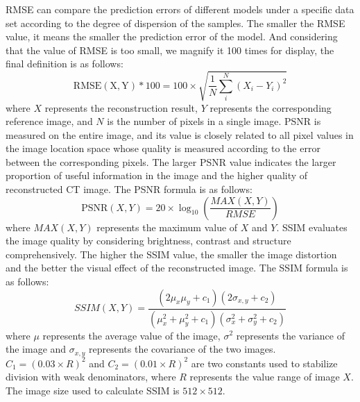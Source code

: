 \documentclass[lettersize,journal]{IEEEtran}
\begin{document}
RMSE can compare the prediction errors of different models under a specific data set according to the degree of dispersion of the samples. The smaller the RMSE value, it means the smaller the prediction error of the model. And considering that the value of RMSE is too small, we magnify it 100 times for display, the final definition is as follows:
\begin{equation}
\mathrm{RMSE(X, Y)*100} = 100\times \sqrt{\frac{1}{N}\sum_{i}^N (X_i - Y_i)^2}  
\end{equation}
where $X$ represents the reconstruction result, $Y$ represents the corresponding reference image, and $N$ is the number of pixels in a single image. PSNR is measured on the entire image, and its value is closely related to all pixel values in the image location space whose quality is measured according to the error between the corresponding pixels. The larger PSNR value indicates the larger proportion of useful information in the image and the higher quality of reconstructed CT image. The PSNR formula is as follows:
\begin{equation}
\mathrm{PSNR}(X, Y) = 20\times\log_{10}(\frac{MAX(X,Y)}{RMSE})
\end{equation}
where $MAX(X, Y)$ represents the maximum value of $X$ and $Y$. SSIM evaluates the image quality by considering brightness, contrast and structure comprehensively. The higher the SSIM value, the smaller the image distortion and the better the visual effect of the reconstructed image. The SSIM formula is as follows:
\begin{equation}
SSIM(X, Y) = \frac{(2\mu_x\mu_y+c_1)(2\sigma_{x, y}+c_2)}{(\mu^2_x+\mu^2_y+c_1)(\sigma^2_x+\sigma^2_y+c_2)}
\end{equation}
where $\mu$ represents the average value of the image, $\sigma^2$ represents the variance of the image and $\sigma_{x, y}$ represents the covariance of the two images. $C_1 = (0.03\times R)^2$ and $C_2 = (0.01\times R)^2$ are two constants used to stabilize division with weak denominators, where $R$ represents the value range of image $X$. The image size used to calculate SSIM is $512\times 512$.
\end{document}
